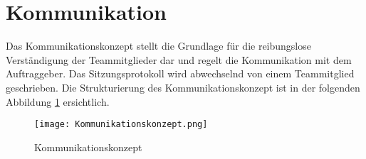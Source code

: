 \section{Kommunikation}

Das Kommunikationskonzept stellt die Grundlage für die reibungslose Verständigung der Teammitglieder dar und regelt die Kommunikation mit dem Auftraggeber. Das Sitzungsprotokoll wird abwechselnd von einem Teammitglied geschrieben. Die Strukturierung des Kommunikationskonzept ist in der folgenden Abbildung \ref{fig::Kommunikationskonzept} ersichtlich.

\begin{figure}[h] 
\centering
\texttt{[image: Kommunikationskonzept.png]}%
\caption{Kommunikationskonzept}%
\label{fig::Kommunikationskonzept}%
\end{figure}